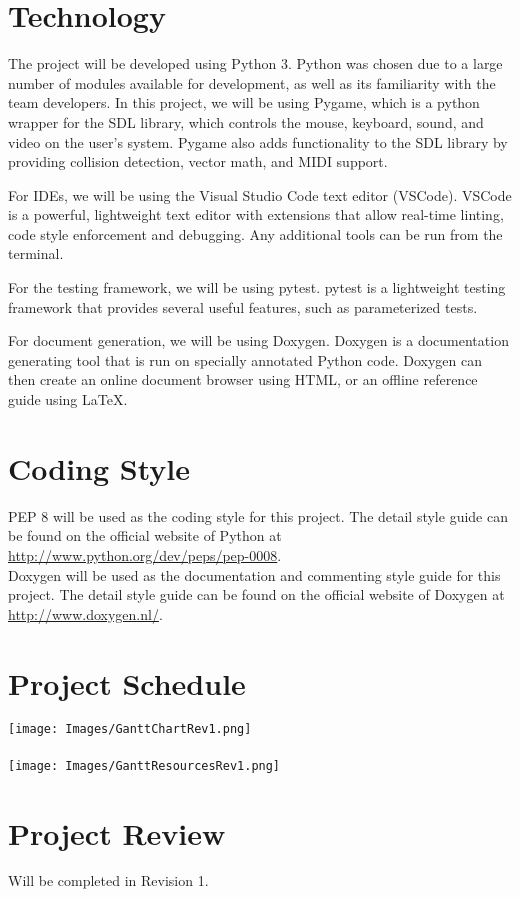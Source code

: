 \documentclass[12pt, titlepage]{article}
\begin{document}
\section{Technology}

The project will be developed using Python 3. Python was chosen due to a large number of modules available for development, as well as its familiarity with the team developers. In this project, we will be using Pygame, which is a python wrapper for the SDL library, which controls the mouse, keyboard, sound, and video on the user's system. Pygame also adds functionality to the SDL library by providing collision detection, vector math, and MIDI support. 

For IDEs, we will be using the Visual Studio Code text editor (VSCode). VSCode is a powerful, lightweight text editor with extensions that allow real-time linting, code style enforcement and debugging. Any additional tools can be run from the terminal. 

For the testing framework, we will be using pytest. pytest is a lightweight testing framework that provides several useful features, such as parameterized tests.

For document generation, we will be using Doxygen. Doxygen is a documentation generating tool that is run on specially annotated Python code. Doxygen can then create an online document browser using HTML, or an offline reference guide using \LaTeX.


\section{Coding Style}

PEP 8 will be used as the coding style for this project. The detail style guide can be found on the official website of Python at \url{http://www.python.org/dev/peps/pep-0008}.\\
Doxygen will be used as the documentation and commenting style guide for this project. The detail style guide can be found on the official website of Doxygen at \url{http://www.doxygen.nl/}.

\section{Project Schedule} \label{gantt}
\texttt{[image: Images/GanttChartRev1.png]}\\
\\
\texttt{[image: Images/GanttResourcesRev1.png]}

\section{Project Review}
Will be completed in Revision 1.
\end{document}
